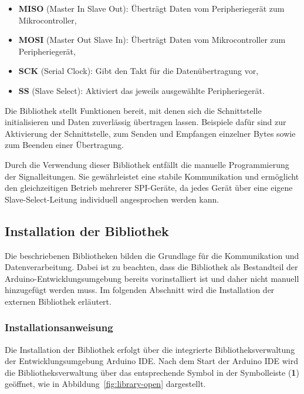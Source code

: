 \begin{itemize}
	\item \textbf{MISO} (Master In Slave Out): Überträgt Daten vom Peripheriegerät zum Mikrocontroller,
	\item \textbf{MOSI} (Master Out Slave In): Überträgt Daten vom Mikrocontroller zum Peripheriegerät,
	\item \textbf{SCK} (Serial Clock): Gibt den Takt für die Datenübertragung vor,
	\item \textbf{SS} (Slave Select): Aktiviert das jeweils ausgewählte Peripheriegerät.
\end{itemize}

Die Bibliothek  stellt Funktionen bereit, 
mit denen sich die Schnittstelle initialisieren und Daten zuverlässig übertragen lassen. 
Beispiele dafür sind  zur Aktivierung der Schnittstelle, 
 zum Senden und Empfangen einzelner Bytes 
sowie  zum Beenden einer Übertragung. 

Durch die Verwendung dieser Bibliothek entfällt die manuelle Programmierung der Signalleitungen. 
Sie gewährleistet eine stabile Kommunikation und ermöglicht den gleichzeitigen Betrieb mehrerer SPI-Geräte, 
da jedes Gerät über eine eigene Slave-Select-Leitung individuell angesprochen werden kann.



\newpage





 
 \subsection{Installation der Bibliothek }\label{Libraryinstall}
 
 Die beschriebenen Bibliotheken bilden die Grundlage für die Kommunikation und Datenverarbeitung. 
 Dabei ist zu beachten, dass die Bibliothek  als Bestandteil der Arduino-Entwicklungsumgebung 
 bereits vorinstalliert ist und daher nicht manuell hinzugefügt werden muss. 
 Im folgenden Abschnitt wird die Installation der externen Bibliothek  erläutert.
 
 
 \subsubsection{Installationsanweisung}
 
 Die Installation der Bibliothek  erfolgt über die integrierte Bibliotheksverwaltung der Entwicklungsumgebung Arduino IDE. 
 Nach dem Start der Arduino IDE wird die Bibliotheksverwaltung über das entsprechende Symbol in der Symbolleiste (\textbf{1}) geöffnet, 
 wie in Abbildung~\ref{fig:library-open} dargestellt.
 
